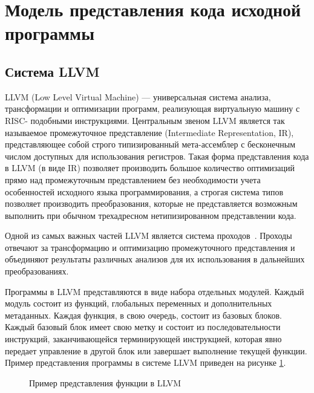 \section{Модель представления кода исходной программы}

\subsection{Система LLVM}
LLVM (Low Level Virtual Machine) --- универсальная система анализа, 
трансформации и оптимизации программ, реализующая виртуальную машину с RISC-
подобными инструкциями. Центральным звеном LLVM является так называемое 
промежуточное представление (Intermediate Representation, IR), представляющее 
собой строго типизированный мета-ассемблер с бесконечным числом доступных для 
использования регистров.  Такая форма представления кода в LLVM (в виде IR) 
позволяет производить большое количество оптимизаций прямо над промежуточным 
представлением без необходимости учета особенностей исходного языка 
программирования, а строгая система типов позволяет производить преобразования, 
которые не представляется возможным выполнить при обычном трехадресном
нетипизированном представлении кода.

Одной из самых важных частей LLVM является система проходов~\cite{llvmpass}. 
Проходы отвечают за трансформацию и оптимизацию промежуточного представления и 
объединяют результаты различных анализов для их использования в дальнейших 
преобразованиях.

Программы в LLVM представляются в виде набора отдельных модулей. Каждый модуль 
состоит из функций, глобальных переменных и дополнительных метаданных. Каждая 
функция, в свою очередь, состоит из базовых блоков. Каждый базовый блок имеет 
свою метку и состоит из последовательности инструкций, заканчивающейся 
терминирующей инструкцией, которая явно передает управление в другой блок или 
завершает выполнение текущей функции. Пример представления программы в системе 
LLVM приведен на рисунке \ref{image:llvmIR}.
\begin{figure}[h!]
\caption{Пример представления функции в LLVM}
\label{image:llvmIR}
\end{figure}
    
